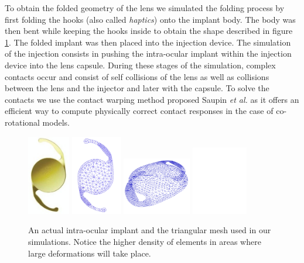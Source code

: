 \documentclass{llncs}
\begin{document}
To obtain the folded geometry of the lens we simulated the folding process by first folding the hooks (also called \emph{haptics}) onto the implant body. The body was then bent while keeping the hooks inside to obtain the shape described in figure \ref{fig-implant}. The folded implant was then placed into the injection device. The simulation of the injection consists in pushing the intra-ocular implant within the injection device into the lens capsule. During these stages of the simulation, complex contacts occur and consist of self collisions of the lens as well as collisions between the lens and the injector and later with the capsule. To solve the contacts we use the contact warping method proposed Saupin \emph{et al.} \cite{Saupin08} as it offers an efficient way to compute physically correct contact responses in the case of co-rotational models. 

\begin{figure}[!h]
\centering
\includegraphics[height=3.5cm]{images/IOL}
\hfill
\includegraphics[height=3.5cm]{images/mesh_implant}
\hfill
\includegraphics[height=2.5cm]{images/implant_haptics_in}
\hfill
\includegraphics[height=3.0cm]{images/implant_folded}
\caption [Lens implant and its mesh] {An actual intra-ocular implant and the triangular mesh used in our simulations. Notice the higher density of elements in areas where large deformations will take place.}
\label{fig-implant}
\end{figure}
\end{document}
